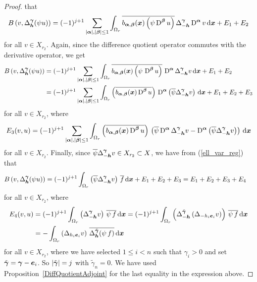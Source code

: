 \begin{proof}
that
\[
B\left(v,\Delta_{{\bm{h}}}^{{\bm{\gamma}}}(\psi u)\right) =
(-1)^{j+1} \sum_{|{\bm{\alpha}}|,|{\bm{\beta}}|\leq 1}
\int_{\Omega_r} \overline{ b_{{\bm{\alpha}},{\bm{\beta}}}({\bm{x}})
\left(\psi \operatorname{D}^{{\bm{\beta}}} u\right)} \,
\Delta_{-{\bm{h}}}^{{\bm{\gamma}}} \operatorname{D}^{{\bm{\alpha}}} v \,\mathrm{d}{{\bm{x}}} + E_1 + E_2
\]
for all $v \in X_{r_2}$.
Again, since the difference quotient operator commutes with the
derivative operator, we get  
\begin{align*}
B\left(v,\Delta_{{\bm{h}}}^{{\bm{\gamma}}}(\psi u)\right)
&= (-1)^{j+1} \sum_{|{\bm{\alpha}}|,|{\bm{\beta}}|\leq 1}
\int_{\Omega_r}  \overline{ b_{{\bm{\alpha}},{\bm{\beta}}}({\bm{x}})
\left(\psi\, \operatorname{D}^{{\bm{\beta}}} u\right)}
\, \operatorname{D}^{{\bm{\alpha}}} \Delta_{-{\bm{h}}}^{{\bm{\gamma}}} v\,\mathrm{d}{{\bm{x}}}
+ E_1 + E_2 \\
&= (-1)^{j+1} \sum_{|{\bm{\alpha}}|,|{\bm{\beta}}|\leq 1}
\int_{\Omega_r} \left(\overline{b_{{\bm{\alpha}},{\bm{\beta}}}({\bm{x}})
\operatorname{D}^{{\bm{\beta}}} u} \right) \, \operatorname{D}^{{\bm{\alpha}}} \left( \overline{\psi}
\Delta_{-{\bm{h}}}^{{\bm{\gamma}}} v\right) \,\mathrm{d}{{\bm{x}}} + E_1 + E_2 + E_3
\end{align*}
for all $v \in X_{r_2}$, where
\[
E_3(v,u) = (-1)^{j+1} \sum_{|{\bm{\alpha}}|,|{\bm{\beta}}|\leq 1}
\int_{\Omega_r} \left(\overline{b_{{\bm{\alpha}},{\bm{\beta}}}({\bm{x}})
\operatorname{D}^{{\bm{\beta}}} u}\right) \,
\left(\overline{\psi} \operatorname{D}^{{\bm{\alpha}}} \Delta_{-{\bm{h}}}^{{\bm{\gamma}}} v -
\operatorname{D}^{{\bm{\alpha}}} \left( \overline{\psi}
\Delta_{-{\bm{h}}}^{{\bm{\gamma}}} v\right)\right) \,\mathrm{d}{{\bm{x}}}
\]
for all $v \in X_{r_2}$.  Finally, since
$\displaystyle \overline{\psi} \Delta_{-{\bm{h}}}^{{\bm{\gamma}}} v
\in X_{r_2} \subset X$, we have from (\ref{ell_var_reg}) that
\begin{align*}
B\left(v,\Delta_{{\bm{h}}}^{{\bm{\gamma}}}(\psi u)\right)
&= (-1)^{j+1} \int_{\Omega_r}
\left( \overline{\psi} \Delta_{-{\bm{h}}}^{{\bm{\gamma}}} v\right)\,\overline{f}
\,\mathrm{d}{{\bm{x}}} +E_1 + E_2 + E_3 = E_1 + E_2 + E_3 + E_4
\end{align*}
for all $v \in X_{r_2}$, where
\begin{align*}
E_4(v,u) &= (-1)^{j+1} \int_{\Omega_r}
\left( \Delta_{-{\bm{h}}}^{{\bm{\gamma}}} v \right)\,\overline{\psi\, f}
\,\mathrm{d}{{\bm{x}}}
= (-1)^{j+1} \int_{\Omega_r}
\left( \Delta^{\tilde{{\bm{\gamma}}}}_{-{\bm{h}}}
\left(\Delta_{-h_i {\bm{e}}_i} v \right)
\right) \,\overline{\psi\, f} \,\mathrm{d}{{\bm{x}}} \\
&= - \int_{\Omega_r} \left(\Delta_{h_i {\bm{e}}_i} v \right)
\,\overline{\Delta^{\tilde{{\bm{\gamma}}}}_{{\bm{h}}} (\psi\, f)} \,\mathrm{d}{{\bm{x}}}
\end{align*}
for all $v \in X_{r_2}$, where we have selected $1 \leq i < n$ such
that $\gamma_i >0$ and set $\tilde{{\bm{\gamma}}} = {\bm{\gamma}} - {\bm{e}}_i$.
So $|\tilde{{\bm{\gamma}}}| = j$ with $\tilde{\gamma}_n = 0$.
We have used Proposition~\ref{DiffQuotientAdjoint} for the last
equality in the expression above.


\end{proof}
